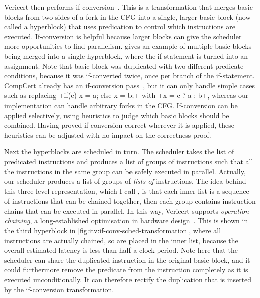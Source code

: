 Vericert then performs
\gls{if-conversion}~\cite{allen83_conver_contr_depen_data_depen}. This is a
transformation that merges basic blocks from two sides of a fork in the CFG into
a single, larger basic block (now called a hyperblock) that uses predication to
control which instructions are executed.  If-conversion is helpful because
larger blocks can give the scheduler more opportunities to find parallelism.
 gives an example of multiple \rtl{}
basic blocks being merged into a single hyperblock, where the if-statement is
turned into an assignment.  Note that basic block was duplicated with two
different predicate conditions, because it was if-converted twice, once per
branch of the if-statement.  CompCert already has an if-conversion
pass~\cite{absint19_compc}, but it can only handle simple cases such as
replacing \rtlinline+if(c) {x = a;} else {x = b;}+ with \rtlinline+x = c ? a : b+, whereas our
implementation can handle arbitrary forks in the CFG.  If-conversion can be
applied selectively, using heuristics to judge which basic blocks should be
combined. Having proved if-conversion correct wherever it is applied, these
heuristics can be adjusted with no impact on the correctness proof.

Next the hyperblocks are scheduled in turn. The scheduler takes the list of
predicated instructions and produces a list of groups of instructions such that
all the instructions in the same group can be safely executed in parallel.
Actually, our scheduler produces a list of groups of \emph{lists of}
instructions.  The idea behind this three-level representation, which I call
\rtlpar, is that each inner list is a sequence of instructions that can be
chained together, then each group contains instruction chains that can be
executed in parallel. In this way, Vericert supports \emph{operation chaining},
a long-established optimisation in hardware
design~\cite[p.~1101]{pangrle87_desig_tools_intel_silic_compil}.  This is shown
in the third hyperblock in \cref{fig:itv:if-conv-sched-transformation}, where
all instructions are actually chained, so are placed in the inner list, because
the overall estimated latency is less than half a clock period.  Note here that
the scheduler can share the duplicated instruction in the original basic block,
and it could furthermore remove the predicate from the instruction completely as
it is executed unconditionally.  It can therefore rectify the duplication that
is inserted by the if-conversion transformation.

